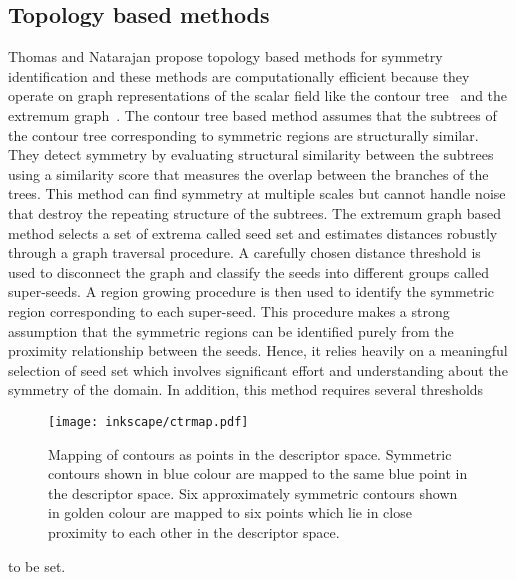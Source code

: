 \documentclass[review,journal]{vgtc}         %
\begin{document}
\subsection{Topology based methods}
Thomas and Natarajan propose topology based methods for symmetry identification and these methods 
are computationally efficient because they operate on graph representations of the scalar field
like the contour tree~\cite{ThomN11} and the extremum graph~\cite{ThomN13}. The contour tree based method 
assumes that the subtrees of the contour tree corresponding to symmetric regions are structurally
similar. They detect symmetry by evaluating structural similarity between the subtrees using a 
similarity score that measures the overlap between the branches of the trees. 
This method can find symmetry at multiple scales but cannot handle
noise that destroy the repeating structure of the subtrees. The extremum 
graph based method selects a set of extrema called seed set and 
estimates distances robustly through a graph traversal procedure. A carefully chosen distance 
threshold is used to disconnect the graph and classify the seeds into different groups called 
super-seeds. A region growing procedure is then used to identify the symmetric region 
corresponding to each super-seed. This procedure makes a strong assumption that the symmetric regions
can be identified purely from the proximity relationship between the seeds. Hence,
it relies heavily on a meaningful selection of seed set which involves significant effort 
and understanding about the symmetry of the domain. In addition, this method requires several thresholds
\begin{figure}[b]
\centering
{
	\texttt{[image: inkscape/ctrmap.pdf]}
	\caption{\label{ctmap}Mapping of contours as points in the descriptor space. Symmetric contours
		shown in blue colour are mapped to the same blue point in the descriptor space. Six approximately
		symmetric contours shown in golden colour are mapped to six points which lie in close
		proximity to each other in the descriptor space.}
}
\end{figure}
to be set.
\end{document}
